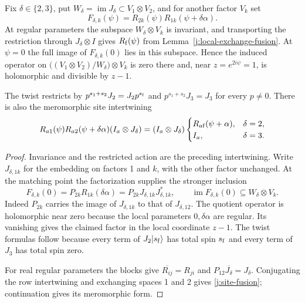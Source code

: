 \begin{lemma}\label{j:local-restriction}
Fix $\delta\in\{2,3\}$, put $W_\delta=\operatorname{im}J_\delta
\subset V_1\otimes V_2$, and for another factor $V_k$ set
\[
F_{\delta,k}(\psi)=R_{2k}(\psi)R_{1k}(\psi+\delta\alpha).
\]
At regular parameters the subspace $W_\delta\otimes V_k$ is invariant,
and transporting the restriction through $J_\delta\otimes I$ gives $R_{\rm f}(\psi)$ from
Lemma~\ref{j:local-exchange-fusion}. At $\psi=0$ the full image of
$F_{\delta,k}(0)$ lies in this subspace. Hence the induced operator on
$\bigl((V_1\otimes V_2)/W_\delta\bigr)\otimes V_k$ is zero there and, near
$z=e^{2i\psi}=1$, is holomorphic and divisible by $z-1$.

The twist restricts by
$p^{s_1+s_2}J_2=J_2p^{s_{\rm f}}$ and
$p^{s_1+s_2}J_3=J_3$ for every $p\ne0$.
There is also the meromorphic site intertwining
\begin{equation}\label{j:site-fusion}
R_{a1}(\psi)R_{a2}(\psi+\delta\alpha)(I_a\otimes J_\delta)
 =(I_a\otimes J_\delta)
\begin{cases}
R_{a{\rm f}}(\psi+\alpha),&\delta=2,\\
I_a,&\delta=3.
\end{cases}
\end{equation}
\end{lemma}
\begin{proof}
Invariance and the restricted action are the preceding intertwining.
Write $J_{\delta,1k}$ for the embedding on factors 1 and $k$, with
the other factor unchanged.
At the matching point the factorization supplies the stronger inclusion
\[
F_{\delta,k}(0)=P_{2k}R_{1k}(\delta\alpha)
 =P_{2k}J_{\delta,1k}J_{\delta,1k}^*,
\qquad
\operatorname{im}F_{\delta,k}(0)\subseteq W_\delta\otimes V_k.
\]
Indeed $P_{2k}$ carries the image of $J_{\delta,1k}$ to that of
$J_{\delta,12}$. The quotient operator is holomorphic near zero because
the local parameters $0,\delta\alpha$ are regular. Its vanishing gives
the claimed factor in the local coordinate $z-1$. The twist formulas
follow because every term of $J_2|s_{\rm f}\rangle$ has total spin
$s_{\rm f}$ and every term of $J_3$ has total spin zero.

For real regular parameters the blocks give
$\overline{R_{ij}}=R_{ji}$ and $P_{12}\overline{J_\delta}=J_\delta$.
Conjugating the row intertwining and exchanging spaces 1 and 2 gives
\eqref{j:site-fusion}; continuation gives its meromorphic form.
\end{proof}


